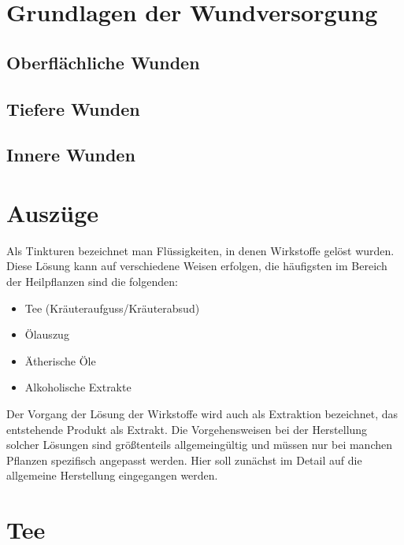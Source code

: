 \section{Grundlagen der Wundversorgung}


\subsection{Oberflächliche Wunden}


\subsection{Tiefere Wunden}


\subsection{Innere Wunden}





\section{Auszüge}

Als Tinkturen bezeichnet man Flüssigkeiten, in denen Wirkstoffe gelöst wurden. Diese Lösung kann auf verschiedene Weisen erfolgen, die häufigsten im Bereich der Heilpflanzen sind die folgenden:

\begin{itemize}
	\item Tee (Kräuteraufguss/Kräuterabsud)
	\item Ölauszug
	\item Ätherische Öle
	\item Alkoholische Extrakte
\end{itemize}

Der Vorgang der Lösung der Wirkstoffe wird auch als Extraktion bezeichnet, das entstehende Produkt als Extrakt. Die Vorgehensweisen bei der Herstellung solcher Lösungen sind größtenteils allgemeingültig und müssen nur bei manchen Pflanzen spezifisch angepasst werden. Hier soll zunächst im Detail auf die allgemeine Herstellung eingegangen werden.

\section{Tee}

